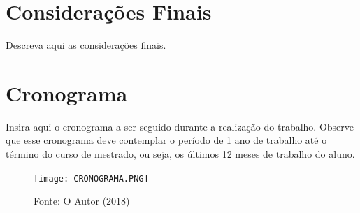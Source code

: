 \documentclass[article,11pt,oneside,a4paper,english,brazil,sumario=tradicional]{abntex2}
\begin{document}
\section{Considerações Finais}
Descreva aqui as considerações finais.  

\section{Cronograma}
Insira aqui o cronograma a ser seguido durante a realização do trabalho. Observe que esse cronograma deve contemplar o período de 1 ano de trabalho até o término do curso de mestrado, ou seja, os últimos 12 meses de trabalho do aluno.  

\begin{quadro}[H]
\label{q:tabela1}
\centering
\caption{Cronograma de atividades (últimos 12 meses).}
\begin{figure}[H]
    \centering
    \texttt{[image: CRONOGRAMA.PNG]}
    \label{fig:crono}
    
    Fonte: O Autor (2018)
\end{figure}
\end{quadro}

\renewcommand{\bibsection}{\section{REFER\^ENCIAS}}




\end{document}
